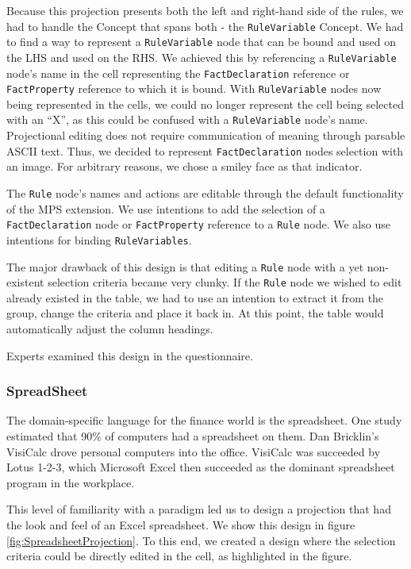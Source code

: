 Because this projection presents both the left and right-hand side of the rules, we had to handle the Concept that spans both - the \texttt{RuleVariable} Concept.
We had to find a way to represent a \texttt{RuleVariable} node that can be bound and used on the LHS and used on the RHS.
We achieved this by referencing a \texttt{RuleVariable} node's name in the cell representing the \texttt{FactDeclaration} reference or \texttt{FactProperty} reference to which it is bound.
With \texttt{RuleVariable} nodes now being represented in the cells, we could no longer represent the cell being selected with an ``X'', as this could be confused with a \texttt{RuleVariable} node's name.
Projectional editing does not require communication of meaning through parsable ASCII text.
Thus, we decided to represent \texttt{FactDeclaration} nodes selection with an image.
For arbitrary reasons, we chose a smiley face as that indicator.

The \texttt{Rule} node's names and actions are editable through the default functionality of the MPS extension.
We use intentions to add the selection of a \texttt{FactDeclaration} node or \texttt{FactProperty} reference to a \texttt{Rule} node.
We also use intentions for binding \texttt{RuleVariables}.

The major drawback of this design is that editing a \texttt{Rule} node with a yet non-existent selection criteria became very clunky.
If the \texttt{Rule} node we wished to edit already existed in the table, we had to use an intention to extract it from the group, change the criteria and place it back in.
At this point, the table would automatically adjust the column headings.

Experts examined this design in the questionnaire.

\subsubsection{SpreadSheet}

The domain-specific language for the finance world is the spreadsheet.
One study estimated that 90\% of computers had a spreadsheet on them\cite{bradley2009using}.
Dan Bricklin's VisiCalc drove personal computers into the office.
VisiCalc was succeeded by Lotus 1-2-3, which Microsoft Excel then succeeded as the dominant spreadsheet program in the workplace.

This level of familiarity with a paradigm led us to design a projection that had the look and feel of an Excel spreadsheet.
We show this design in figure \ref{fig:SpreadsheetProjection}.
To this end, we created a design where the selection criteria could be directly edited in the cell, as highlighted in the figure.

